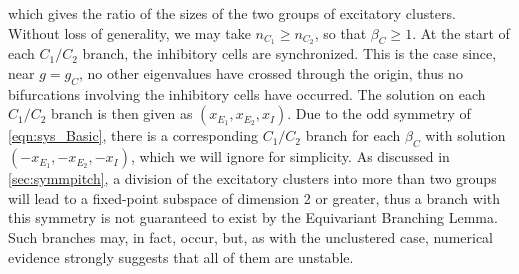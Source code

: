\documentclass[reqno]{siamonline190516}
\begin{document}
{\begin{equation}
\end{equation}
which gives the ratio of the sizes of the two groups of excitatory clusters. Without loss of generality, we may take $n_{C_1} \geq n_{C_2}$, so that $\beta_C \geq 1$. At the start of each $C_1/C_2$ branch, the inhibitory cells are synchronized. This is the case since, near $g = g_C$, no other eigenvalues have crossed through the origin, thus no bifurcations involving the inhibitory cells have occurred. The solution on each $C_1/C_2$ branch is then given as $(x_{E_1}, x_{E_2}, x_{I})$. Due to the odd symmetry of \cref{eqn:sys_Basic}, there is a corresponding $C_1/C_2$ branch for each $\beta_C$ with solution $(-x_{E_1}, -x_{E_2}, -x_{I})$, which we will ignore for simplicity. As discussed in \cref{sec:symmpitch}, a division of the excitatory clusters into more than two groups will lead to a fixed-point subspace of dimension 2 or greater, thus a branch with this symmetry is not guaranteed to exist by the Equivariant Branching Lemma. Such branches may, in fact, occur, but, as with the unclustered case, numerical evidence strongly suggests that all of them are unstable.
}
\end{document}
